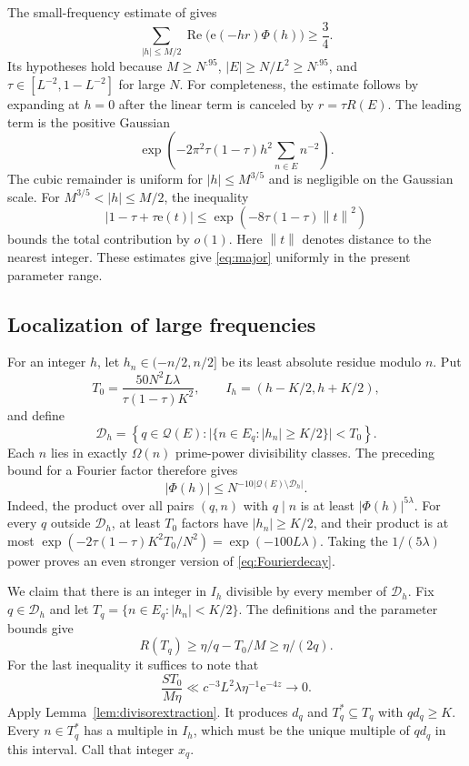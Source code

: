 \documentclass[11pt,leqno]{amsart}
\numberwithin{equation}{section}
\theoremstyle{definition}
\theoremstyle{remark}
\newcommand{\e}{\mathrm e}
\newcommand{\pp}{\mathcal Q}
\newcommand{\card}[1]{\lvert #1\rvert}
\newcommand{\norm}[1]{\left\lVert #1\right\rVert}
\begin{document}
The small-frequency estimate of \cite[Lemma~3.1]{LS} gives
\begin{equation}\label{eq:major}
 \sum_{|h|\le M/2}\operatorname{Re}
       \bigl(\mathrm e(-hr)\Phi(h)\bigr)\ge\frac34.
\end{equation}
Its hypotheses hold because $M\ge N^{.95}$,
$\card E\ge N/L^2\ge N^{.95}$, and
$\tau\in[L^{-2},1-L^{-2}]$ for large $N$.
For completeness, the estimate follows by expanding at $h=0$ after the
linear term is canceled by $r=\tau R(E)$. The leading term is the
positive Gaussian
\[
 \exp\left(-2\pi^2\tau(1-\tau)h^2
                  \sum_{n\in E}n^{-2}\right).
\]
The cubic remainder is uniform for $|h|\le M^{3/5}$ and is negligible
on the Gaussian scale. For $M^{3/5}<|h|\le M/2$, the inequality
\[
 |1-\tau+\tau\mathrm e(t)|\le
 \exp(-8\tau(1-\tau)\norm{t}^2)
\]
bounds the total contribution by $o(1)$. Here $\norm{t}$ denotes
distance to the nearest integer. These estimates give
\eqref{eq:major} uniformly in the present parameter range.

\subsection{Localization of large frequencies}

For an integer $h$, let $h_n\in(-n/2,n/2]$ be its least absolute
residue modulo $n$. Put
\[
 T_0=\frac{50N^2L\lambda}{\tau(1-\tau)K^2},\qquad
 I_h=(h-K/2,h+K/2),
\]
and define
\[
 \mathcal D_h=\left\{q\in\pp(E):
       \card{\{n\in E_q:|h_n|\ge K/2\}}<T_0\right\}.
\]
Each $n$ lies in exactly $\Omega(n)$ prime-power divisibility classes.
The preceding bound for a Fourier factor therefore gives
\begin{equation}\label{eq:Fourierdecay}
 |\Phi(h)|\le N^{-10\card{\pp(E)\setminus\mathcal D_h}}.
\end{equation}
Indeed, the product over all pairs $(q,n)$ with $q\mid n$ is at least
$|\Phi(h)|^{5\lambda}$. For every $q$ outside $\mathcal D_h$, at least
$T_0$ factors have $|h_n|\ge K/2$, and their product is at most
$\exp(-2\tau(1-\tau)K^2T_0/N^2)=\exp(-100L\lambda)$.
Taking the $1/(5\lambda)$ power proves an even stronger version of
\eqref{eq:Fourierdecay}.

We claim that there is an integer in $I_h$ divisible by every member
of $\mathcal D_h$. Fix $q\in\mathcal D_h$ and let
$T_q=\{n\in E_q:|h_n|<K/2\}$.
The definitions and the parameter bounds give
\[
 R(T_q)\ge\eta/q-T_0/M\ge\eta/(2q).
\]
For the last inequality it suffices to note that
\[
 \frac{S T_0}{M\eta}
 \ll c^{-3}L^2\lambda\eta^{-1}\e^{-4z}\longrightarrow0.
\]
Apply Lemma~\ref{lem:divisorextraction}. It produces $d_q$ and
$T_q^*\subseteq T_q$ with $qd_q\ge K$.
Every $n\in T_q^*$ has a multiple in $I_h$, which must be the unique
multiple of $qd_q$ in this interval. Call that integer $x_q$.
\end{document}
